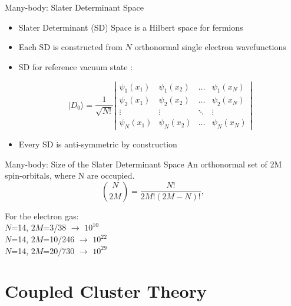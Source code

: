 \documentclass{beamer}
\begin{document}
  \begin{frame}{Many-body: Slater Determinant Space}
  \begin{itemize}
  	\item Slater Determinant (SD) Space is a Hilbert space for fermions 
  	\item Each SD is constructed from $N$ orthonormal single electron
  	wavefunctions
  	
  	\item SD for reference vacuum state :
 
  \begin{equation*}
  |D_0\rangle = \frac{1}{\sqrt{N!}}
  \left| \begin{array}{ccccc} \psi_{1}(x_1)& \psi_{1}(x_2)& \dots & \psi_{1}(x_N)\\
  \psi_{2}(x_1)&\psi_{2}(x_2)& \dots  & \psi_{2}(x_N)\\  
  \vdots & \vdots & \ddots  & \vdots \\
  \psi_{N}(x_1)&\psi_{N}(x_2)& \dots  & \psi_{N}(x_N)\end{array} \right| 
  \end{equation*}
  \item Every  SD is anti-symmetric by construction
   \end{itemize}
  \end{frame}

 \begin{frame}{Many-body: Size of the Slater Determinant Space}
An orthonormal set of 2M spin-orbitals, where N are occupied.
\begin{equation*}
\binom {N}{2M} = \frac{N!}{2M!(2M-N)!}, 
\end{equation*}

For the electron gas:\\
$N$=14, $2M$=3/38	$\rightarrow$ $10^{10}$\\
$N$=14, $2M$=10/246	$\rightarrow$ $10^{22}$\\
$N$=14, $2M$=20/730	$\rightarrow$ $10^{29}$
\end{frame}



\section{Coupled Cluster Theory}
\end{document}
